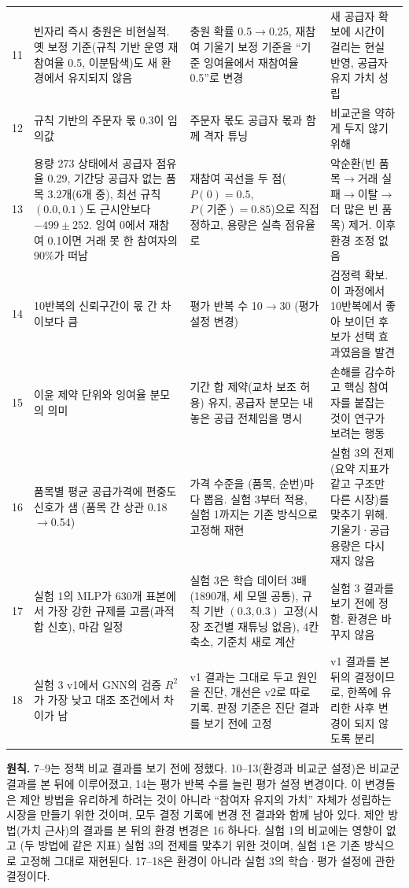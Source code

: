 \documentclass[11pt,a4paper]{article}
\newcommand{\keypoint}[1]{%
  \par\smallskip\noindent\colorbox{boxbg}{\parbox{\dimexpr\linewidth-2\fboxsep}{#1}}\par\smallskip}
\begin{document}
{\begin{longtable}{p{0.5cm}p{4.4cm}p{4.6cm}p{4.9cm}}
11 & 빈자리 즉시 충원은 비현실적. 옛 보정 기준(규칙 기반 운영 재참여율 0.5, 이분탐색)도 새 환경에서 유지되지 않음 &
충원 확률 0.5$\to$0.25, 재참여 기울기 보정 기준을 ``기준 잉여율에서 재참여율 0.5''로 변경 &
새 공급자 확보에 시간이 걸리는 현실 반영, 공급자 유지 가치 성립\\
12 & 규칙 기반의 주문자 몫 0.3이 임의값 &
주문자 몫도 공급자 몫과 함께 격자 튜닝 &
비교군을 약하게 두지 않기 위해\\
13 & 용량 273 상태에서 공급자 점유율 0.29, 기간당 공급자 없는 품목 3.2개(6개 중), 최선 규칙 $(0.0,0.1)$도 근시안보다 $-499\pm252$. 잉여 0에서 재참여 0.1이면 거래 못 한 참여자의 90\%가 떠남 &
재참여 곡선을 두 점($P(0)=0.5$, $P(\text{기준})=0.85$)으로 직접 정하고, 용량은 실측 점유율로 &
악순환(빈 품목$\to$거래 실패$\to$이탈$\to$더 많은 빈 품목) 제거. 이후 환경 조정 없음\\
14 & 10반복의 신뢰구간이 몫 간 차이보다 큼 &
평가 반복 수 10$\to$30 (평가 설정 변경) &
검정력 확보. 이 과정에서 10반복에서 좋아 보이던 후보가 선택 효과였음을 발견\\
15 & 이윤 제약 단위와 잉여율 분모의 의미 &
기간 합 제약(교차 보조 허용) 유지, 공급자 분모는 내놓은 공급 전체임을 명시 &
손해를 감수하고 핵심 참여자를 붙잡는 것이 연구가 보려는 행동\\
16 & 품목별 평균 공급가격에 편중도 신호가 샘 (품목 간 상관 0.18$\to$0.54) &
가격 수준을 (품목, 순번)마다 뽑음. 실험 3부터 적용, 실험 1까지는 기존 방식으로 고정해 재현 &
실험 3의 전제(요약 지표가 같고 구조만 다른 시장)를 맞추기 위해. 기울기·공급용량은 다시 재지 않음\\
17 & 실험 1의 MLP가 630개 표본에서 가장 강한 규제를 고름(과적합 신호), 마감 일정 &
실험 3은 학습 데이터 3배(1890개, 세 모델 공통), 규칙 기반 $(0.3,0.3)$ 고정(시장 조건별 재튜닝 없음), 4칸 축소, 기준치 새로 계산 &
실험 3 결과를 보기 전에 정함. 환경은 바꾸지 않음\\
18 & 실험 3 v1에서 GNN의 검증 $R^2$가 가장 낮고 대조 조건에서 차이가 남 &
v1 결과는 그대로 두고 원인을 진단, 개선은 v2로 따로 기록. 판정 기준은 진단 결과를 보기 전에 고정 &
v1 결과를 본 뒤의 결정이므로, 한쪽에 유리한 사후 변경이 되지 않도록 분리\\
\bottomrule
\end{longtable}
}

\keypoint{\textbf{원칙.} 7--9는 정책 비교 결과를 보기 전에 정했다. 10--13(환경과 비교군 설정)은
비교군 결과를 본 뒤에 이루어졌고, 14는 평가 반복 수를 늘린 평가 설정 변경이다.
이 변경들은 제안 방법을 유리하게 하려는 것이 아니라 ``참여자 유지의 가치'' 자체가 성립하는
시장을 만들기 위한 것이며, 모두 결정 기록에 변경 전 결과와 함께 남아 있다.
제안 방법(가치 근사)의 결과를 본 뒤의 환경 변경은 16 하나다. 실험 1의 비교에는 영향이 없고
(두 방법에 같은 지표) 실험 3의 전제를 맞추기 위한 것이며, 실험 1은 기존 방식으로 고정해 그대로 재현된다.
17--18은 환경이 아니라 실험 3의 학습·평가 설정에 관한 결정이다.}
\end{document}
